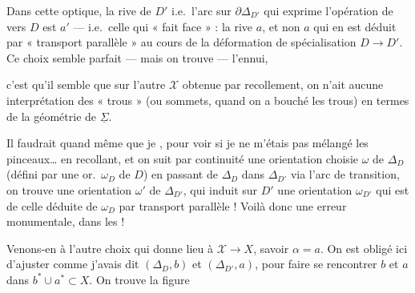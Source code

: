 \documentclass[11pt,a4paper]{article}
\begin{document}
Dans cette optique, la rive de $D'$ i.e.\ l'arc sur $\partial\Delta_{D'}$ qui exprime l'opération de   vers $D$ est $a'$ --- i.e.\ celle qui « fait face » : la rive $a$, et non $a$ qui en est déduit par « transport parallèle » au cours de la déformation de spécialisation $D \to D'$. Ce choix semble parfait --- mais on trouve --- l'ennui,

c'est qu'il semble que sur l'autre $\mathcal{X}$ obtenue par recollement, on n'ait aucune interprétation des « trous » (ou sommets, quand on a bouché les trous) en termes de la géométrie de $\underline{\Sigma}$.

\struck{\ill{}} Il faudrait quand même que je , pour voir si je ne m'étais pas mélangé les pinceaux\ldots{} \ill{} \ill{}  en recollant, et  on suit par continuité une orientation choisie $\omega$ de $\Delta_D$ (défini par une or.\ $\omega_D$ de $D$) en passant de $\Delta_D$ dans $\Delta_{D'}$ via l'arc de transition, on trouve  une orientation $\omega'$ de $\Delta_{D'}$, qui induit sur $D'$ une orientation $\omega_{D'}$ qui est \emph{} de celle déduite de $\omega_D$ par \struck{\ill{}} transport parallèle ! Voilà donc  une erreur monumentale,  dans les  !

Venons-en à l'autre choix qui donne lieu à $\mathcal{X} \to X$, savoir $\alpha = a$. On est obligé ici d'ajuster comme j'avais dit $(\Delta_D, b)$ et $(\Delta_{D'}, a)$, pour faire se rencontrer $b$ et $a$ dans $b^{*} \cup a^{*} \subset X$. On trouve la figure
\end{document}
